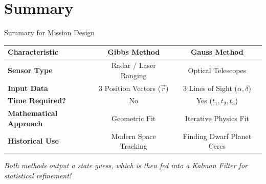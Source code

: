 \documentclass[aspectratio=169]{beamer}
\begin{document}
\section{Summary}

\begin{frame}{Summary for Mission Design}
    \begin{table}[]
        \centering
        \begin{tabular}{@{}lcc@{}}
        \toprule
        \textbf{Characteristic} & \textbf{Gibbs Method} & \textbf{Gauss Method} \\ \midrule
        \textbf{Sensor Type} & Radar / Laser Ranging & Optical Telescopes \\
        \textbf{Input Data} & 3 Position Vectors ($\vec{r}$) & 3 Lines of Sight ($\alpha, \delta$) \\
        \textbf{Time Required?} & No & Yes ($t_1, t_2, t_3$) \\
        \textbf{Mathematical Approach} & Geometric Fit & Iterative Physics Fit \\
        \textbf{Historical Use} & Modern Space Tracking & Finding Dwarf Planet Ceres \\ \bottomrule
        \end{tabular}
    \end{table}
    
    \vspace{0.5cm}
    \centering \textit{Both methods output a state guess, which is then fed into a Kalman Filter for statistical refinement!}
\end{frame}
\end{document}
